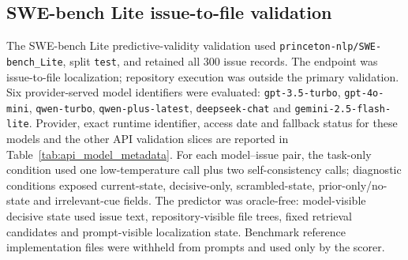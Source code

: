 ﻿\documentclass[preprint,12pt,authoryear]{elsarticle}
\begin{document}
\subsection{SWE-bench Lite issue-to-file validation}

The SWE-bench Lite predictive-validity validation used \texttt{princeton-nlp/SWE-bench\_Lite}, split \texttt{test}, and retained all 300 issue records. The endpoint was issue-to-file localization; repository execution was outside the primary validation. Six provider-served model identifiers were evaluated: \texttt{gpt-3.5-turbo}, \texttt{gpt-4o-mini}, \texttt{qwen-turbo}, \texttt{qwen-plus-latest}, \texttt{deepseek-chat} and \texttt{gemini-2.5-flash-lite}. Provider, exact runtime identifier, access date and fallback status for these models and the other API validation slices are reported in Table~\ref{tab:api_model_metadata}. For each model--issue pair, the task-only condition used one low-temperature call plus two self-consistency calls; diagnostic conditions exposed current-state, decisive-only, scrambled-state, prior-only/no-state and irrelevant-cue fields. The predictor was oracle-free: model-visible decisive state used issue text, repository-visible file trees, fixed retrieval candidates and prompt-visible localization state. Benchmark reference implementation files were withheld from prompts and used only by the scorer.
\end{document}
